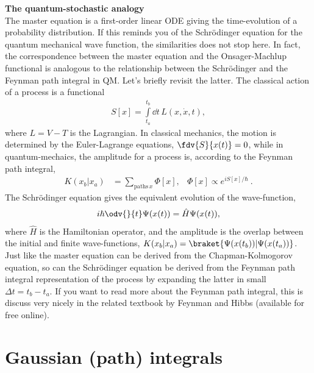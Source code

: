\begin{framed}
    \noindent
    \textbf{The quantum-stochastic analogy}\\
    The master equation is a first-order linear ODE giving the time-evolution of a probability distribution.
    If this reminds you of the Schrödinger equation for the quantum mechanical wave function, the similarities does not stop here.
    In fact, the correspondence between the master equation and the Onsager-Machlup functional is analogous to the relationship between the Schrödinger and the Feynman path integral in QM. Let's briefly revisit the latter.
    The classical action of a process is a functional
    \begin{align}
        S[x] = \int\limits_{t_a}^{t_b} \dd t \, L(x, \dot x, t), 
    \end{align}
    where $L = V - T$ is the Lagrangian.
    In classical mechanics, the motion is determined by the Euler-Lagrange equations, $\fdv{ S }{ x(t) } = 0$, while in quantum-mechaics, the amplitude for a process is, according to the Feynman path integral,
    \begin{align}
        K(x_b | x_a) &= \sum_{\mathrm{paths}\, x} \Phi[x], & \Phi[x] \propto e^{iS[x] / \hbar}~.
    \end{align}
    The Schrödinger equation gives the equivalent evolution of the wave-function,
    \begin{align}
        i \hbar \odv{  }{ t } \Psi(x(t)) = \hat H \Psi(x(t)),
    \end{align}
    where $\hat H$ is the Hamiltonian operator, and the amplitude is the overlap between the initial and finite wave-functions, $K(x_b | x_a) = \braket{ \Psi(x(t_b)) | \Psi(x(t_a)) } $. Just like the master equation can be derived from the Chapman-Kolmogorov equation, so can the Schrödinger equation be derived from the Feynman path integral representation of the process by expanding the latter in small $\Delta t = t_b - t_a$. If you want to read more about the Feynman path integral, this is discuss very nicely in the related textbook by Feynman and Hibbs (available for free online).
\end{framed}




\section{Gaussian (path) integrals}

